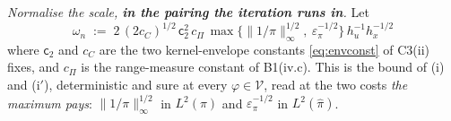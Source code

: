 \begin{definition}
\emph{Normalise the scale, \textbf{in the pairing the iteration runs in}.} Let
\begin{equation}\label{eq:normconst}
\omega_n\;:=\;2\,(2c_C)^{1/2}\,\mathsf c_2^{2}\,c_\Pi\,
\max\big\{\|1/\pi\|_\infty^{1/2},\ \varepsilon_\pi^{-1/2}\big\}\,h_u^{-1}h_x^{-1/2}
\end{equation}
where $\mathsf c_2$ and $c_C$ are the two kernel-envelope constants \eqref{eq:envconst} of C3(ii)
fixes, and $c_\Pi$ is the range-measure constant of B1(iv.c).
This is
the bound of \textup{(i)} and \textup{(i$'$)}, deterministic and sure at
every $\varphi\in\mathcal V$, read at the two costs \emph{the maximum pays}:
$\|1/\pi\|_\infty^{1/2}$ in $L^{2}(\pi)$ and $\varepsilon_\pi^{-1/2}$ in $L^{2}(\hat\pi)$.

\end{definition}
